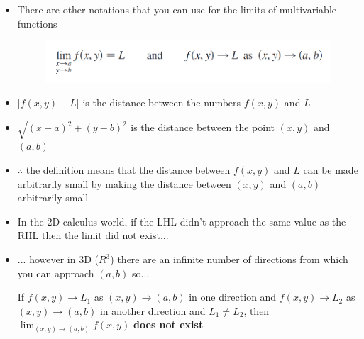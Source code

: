\documentclass{package/notes}
\begin{document}
\begin{itemize}
	\item There are other notations that you can use for the limits of multivariable functions
		\begin{figure}[h]
			\begin{center}
				\includegraphics[width=12cm]{images/2.2.1_Image.PNG}
			\end{center}
		\end{figure}
	\item $|f(x,y)-L|$ is the distance between the numbers $f(x,y)$ and $L$
	\item $\sqrt{(x-a)^2+(y-b)^2}$ is the distance between the point $(x,y)$ and $(a,b)$
	\item $\therefore$ the definition means that the distance between $f(x,y)$ and $L$ can be made arbitrarily small by making the distance between $(x,y)$ and $(a,b)$ arbitrarily small
	\item In the 2D calculus world, if the LHL didn't approach the same value as the RHL then the limit did not exist...
	\item ... however in 3D ($R^3$) there are an infinite number of directions from which you can approach $(a,b)$ so...

\begin{proposition}
	If $f(x,y) \to L_1$ as $(x,y)\to (a,b)$ in one direction and $f(x,y) \to L_2$ as $(x,y)\to (a,b)$ in another direction and $L_1 \ne L_2$, then $\lim_{(x,y)\to(a,b)}f(x,y)$ \textbf{does not exist}
\end{proposition}


\end{itemize}
\end{document}
